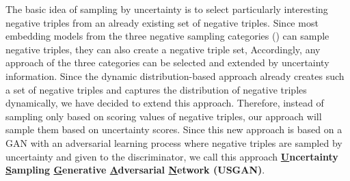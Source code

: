 The basic idea of sampling by uncertainty is to select particularly interesting negative triples from an already existing set of negative triples.
Since most embedding models from the three negative sampling categories () can sample negative triples, they can also create a negative triple set,
Accordingly, any approach of the three categories can be selected and extended by uncertainty information.
Since the dynamic distribution-based approach \kbgan already creates such a set of negative triples and captures the distribution of negative triples dynamically, we have decided to extend this approach.
Therefore, instead of sampling only based on scoring values of negative triples, our approach will sample them based on uncertainty scores.
Since this new approach is based on a \ac{GAN} with an adversarial learning process where negative triples are sampled by uncertainty and given to the discriminator, we call this approach \textbf{\underline{U}ncertainty \underline{S}ampling \underline{G}enerative \underline{A}dversarial \underline{N}etwork (\textsc{USGAN})}.
